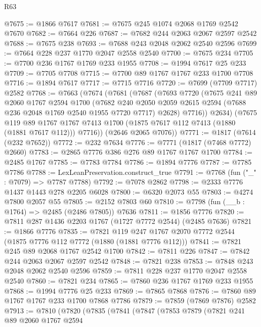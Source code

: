 \begin{lexlean}{R63}
\begin{coremodule}
@7675 := @1866 @7617
@7681 := @7675 @245 @1074 @2068 @1769 @2542 @7670
@7682 := @7664 @226
@7687 := @7682 @244 @2063 @2067 @2597 @2542
@7688 := @7675 @238
@7693 := @7688 @243 @2048 @2062 @2540 @2596
@7699 := @7664 @228 @237 @1770 @2047 @2558 @2540
@7700 := @7675 @234
@7705 := @7700 @236 @1767 @1769 @233 @1955
@7708 := @1994 @7617 @25 @233
@7709 := @7705 @7708
@7715 := @7700 @89 @1767 @1767 @233 @1700 @7708
@7716 := @1894 @7617
@7717 := @7715 @7716
@7720 := @7699 (@7709 @7717) @2582
@7768 := @7663
    (@7674
      (@7681
        (@7687
          (@7693
            @7720
            (@7675
              @241
              @89
              @2060
              @1767
              @2594
              @1700
              (@7682
                @240
                @2050
                @2059
                @2615
                @2594
                (@7688 @236 @2048 @1769 @2540 @1955 @7720 @7717)
                @2628)
              @7716))
          @2634)
        (@7675
          @119
          @89
          @1767
          @1767
          @7413
          @1700
          (@1875 @7617 @112 @7413 (@1880 (@1881 @7617 @112)))
          @7716))
      (@2646 @2065 @7076))
@7771 := @1817 (@7614 (@232 @7652))
@7772 := @232 @7634
@7776 := @7771 (@1817 (@7468 @7772) @2660)
@7783 := @2865 @7776 @386 @276 @89 @1767 @1767 @1700
@7784 := @2485 @1767
@7785 := @7783 @7784
@7786 := @1894 @7776
@7787 := @7785 @7786
@7788 := LexLeanPreservation.construct_true
@7791 := @7768 (fun ("_" : @7079) => @7787 @7788)
@7792 := @7078 @2862
@7798 := @2333 @7776 @1437 @1443 @278 @2205 @6028
@7800 := @6320 @2073 @55
@7803 := @4274 @7800 @2057 @55
@7805 := @2152 @7803 @60
@7810 := @7798 (fun (__b : @1764) => @2485 (@2486 @7805)) @7636
@7811 := @1856 @7776
@7820 := @7811 @287 @1436 @2203 @1767 (@1727 @7772 @2544) (@2485 @7636)
@7821 := @1866 @7776
@7835 := @7821 @119 @247 @1767 @2070 @7772 @2544 (@1875 @7776 @112 @7772 (@1880 (@1881 @7776 @112)))
@7841 := @7821 @245 @89 @2068 @1767 @2542 @1700
@7842 := @7811 @226
@7847 := @7842 @244 @2063 @2067 @2597 @2542
@7848 := @7821 @238
@7853 := @7848 @243 @2048 @2062 @2540 @2596
@7859 := @7811 @228 @237 @1770 @2047 @2558 @2540
@7860 := @7821 @234
@7865 := @7860 @236 @1767 @1769 @233 @1955
@7868 := @1994 @7776 @25 @233
@7869 := @7865 @7868
@7876 := @7860 @89 @1767 @1767 @233 @1700 @7868 @7786
@7879 := @7859 (@7869 @7876) @2582
@7913 := @7810
    (@7820
      (@7835
        (@7841
          (@7847
            (@7853
              @7879
              (@7821
                @241
                @89
                @2060
                @1767
                @2594

\end{coremodule}
\end{lexlean}
